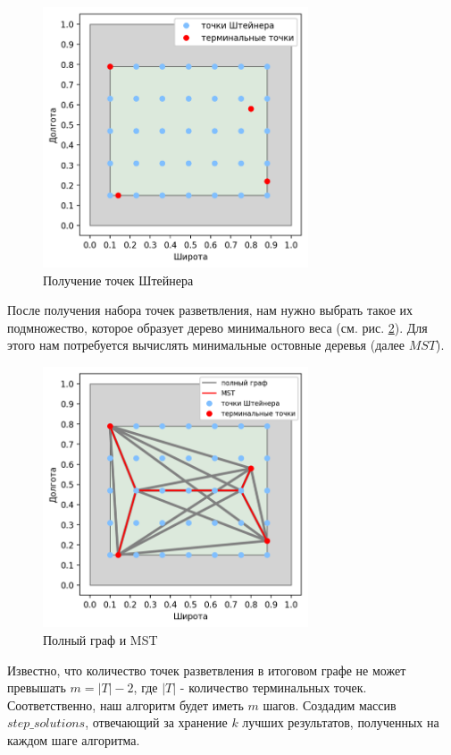\begin{figure}[H]
	\includegraphics[width=0.7\textwidth]{images/4_1.png}
	\caption{Получение точек Штейнера}
	\label{pic:get_steiner_nodes}
\end{figure}
\vskip 4mm
После получения набора точек разветвления, нам нужно выбрать такое их подмножество, которое образует дерево минимального веса (см. рис. \ref{pic:get_MST}). Для этого нам потребуется вычислять минимальные остовные деревья (далее $MST$).

\begin{figure}[H]
	\includegraphics[width=0.7\textwidth]{images/4_2.png}
	\caption{Полный граф и MST}
	\label{pic:get_MST}
\end{figure}
\vskip 4mm

Известно, что количество точек разветвления в итоговом графе не может превышать $m = |T| - 2$, где $|T|$ - количество терминальных точек. Соответственно, наш алгоритм будет иметь $m$ шагов. Создадим массив $step\_solutions$, отвечающий за хранение $k$ лучших результатов, полученных на каждом шаге алгоритма.


